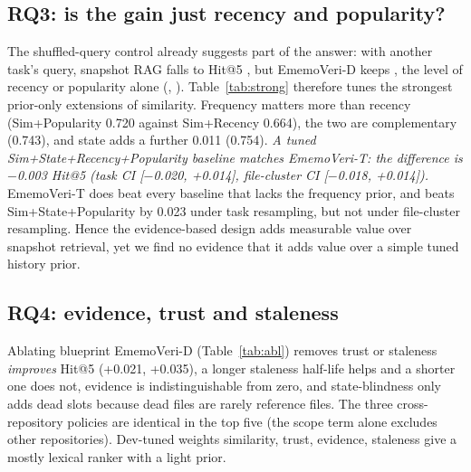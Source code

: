 \documentclass[runningheads]{llncs}
\newcommand{\sys}{EmemoVeri}
\begin{document}
\begin{table}[t]\centering\footnotesize\setlength{\tabcolsep}{3pt}
\resizebox{\linewidth}{!}{}
\caption{Cumulative component ladder on the test split. Weights of the added terms are tuned on dev at each rung.}
\label{tab:ladder}
\end{table}

\subsection{RQ3: is the gain just recency and popularity?}
\label{sec:prior}
The shuffled-query control already suggests part of the answer: with another task's query, snapshot RAG falls to Hit@5 \shufSnapFive{}, but \sys{}-D keeps \shufEmvFive{}, the level of recency or popularity alone (\hitFiveRec{}, \hitFivePop{}). Table~\ref{tab:strong} therefore tunes the strongest prior-only extensions of similarity. Frequency matters more than recency (Sim+Popularity 0.720 against Sim+Recency 0.664), the two are complementary (0.743), and state adds a further 0.011 (0.754). \emph{A tuned Sim+State+Recency+Popularity baseline matches \sys{}-T: the difference is $-$0.003 Hit@5 (task CI [$-$0.020, +0.014], file-cluster CI [$-$0.018, +0.014]).} \sys{}-T does beat every baseline that lacks the frequency prior, and beats Sim+State+Popularity by 0.023 under task resampling, but not under file-cluster resampling. Hence the evidence-based design adds measurable value over snapshot retrieval, yet we find no evidence that it adds value over a simple tuned history prior.

\begin{table}[t]\centering\footnotesize\setlength{\tabcolsep}{3pt}
\resizebox{\linewidth}{!}{}
\caption{Tuned history-prior baselines (Sim: similarity; State: dead files removed; Rec: recency; Pop: frequency; all tuned on dev except snapshot). Last two columns: Hit@5 of \sys{}-T minus the row's system.}
\label{tab:strong}
\end{table}

\subsection{RQ4: evidence, trust and staleness}
\label{sec:components}
Ablating blueprint \sys{}-D (Table~\ref{tab:abl}) removes trust or staleness \emph{improves} Hit@5 (+0.021, +0.035), a longer staleness half-life helps and a shorter one does not, evidence is indistinguishable from zero, and state-blindness only adds \deadBlind{} dead slots because dead files are rarely reference files. The three cross-repository policies are identical in the top five (the scope term alone excludes other repositories). Dev-tuned weights \tunedSim{} similarity, \tunedTrust{} trust, \tunedEv{} evidence, \tunedStale{} staleness give a mostly lexical ranker with a light prior.
\end{document}
